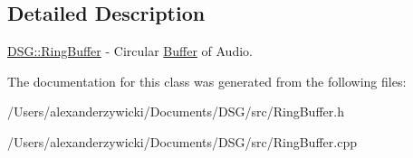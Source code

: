 \subsection{Detailed Description}
\hyperlink{class_d_s_g_1_1_ring_buffer}{D\+S\+G\+::\+Ring\+Buffer} -\/ Circular \hyperlink{class_d_s_g_1_1_buffer}{Buffer} of Audio. 

The documentation for this class was generated from the following files\+:\begin{DoxyCompactItemize}
\item 
/\+Users/alexanderzywicki/\+Documents/\+D\+S\+G/src/Ring\+Buffer.\+h\item 
/\+Users/alexanderzywicki/\+Documents/\+D\+S\+G/src/Ring\+Buffer.\+cpp\end{DoxyCompactItemize}

